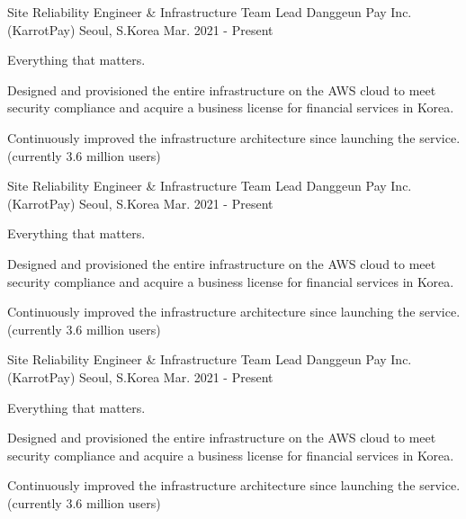 

\begin{cventries}

  \cventry
    {Site Reliability Engineer \& Infrastructure Team Lead} %
    {Danggeun Pay Inc. (KarrotPay)} %
    {Seoul, S.Korea} %
    {Mar. 2021 - Present} %
    {
      \begin{cvitems} %
        \item {Everything that matters.}
        \item {Designed and provisioned the entire infrastructure on the AWS cloud to meet security compliance and acquire a business license for financial services in Korea.}
        \item {Continuously improved the infrastructure architecture since launching the service. (currently 3.6 million users)}
      \end{cvitems}
    }

\cventry
{Site Reliability Engineer \& Infrastructure Team Lead} %
{Danggeun Pay Inc. (KarrotPay)} %
{Seoul, S.Korea} %
{Mar. 2021 - Present} %
{
  \begin{cvitems} %
    \item {Everything that matters.}
    \item {Designed and provisioned the entire infrastructure on the AWS cloud to meet security compliance and acquire a business license for financial services in Korea.}
    \item {Continuously improved the infrastructure architecture since launching the service. (currently 3.6 million users)}
  \end{cvitems}
}

\cventry
{Site Reliability Engineer \& Infrastructure Team Lead} %
{Danggeun Pay Inc. (KarrotPay)} %
{Seoul, S.Korea} %
{Mar. 2021 - Present} %
{
  \begin{cvitems} %
    \item {Everything that matters.}
    \item {Designed and provisioned the entire infrastructure on the AWS cloud to meet security compliance and acquire a business license for financial services in Korea.}
    \item {Continuously improved the infrastructure architecture since launching the service. (currently 3.6 million users)}
  \end{cvitems}
}


\end{cventries}
